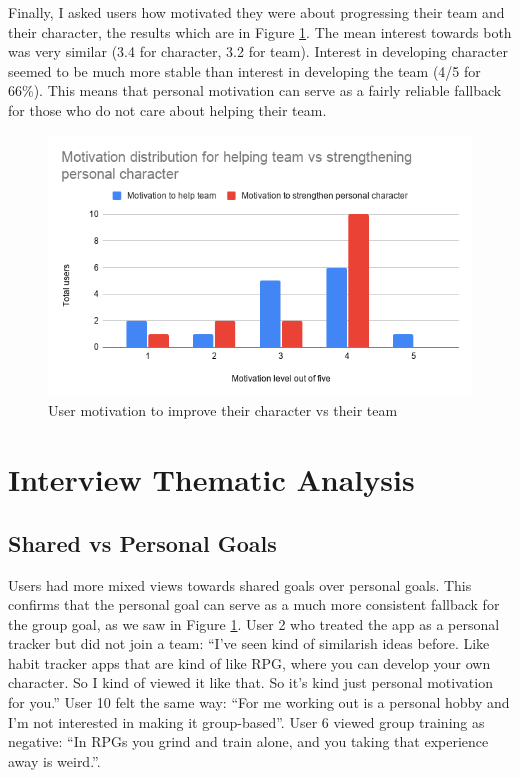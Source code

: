 \documentclass{l4proj}
\begin{document}
Finally, I asked users how motivated they were about progressing their team and their character, the results which are in Figure \ref{fig:character_vs_team}. The mean interest towards both was very similar (3.4 for character, 3.2 for team). Interest in developing character seemed to be much more stable than interest in developing the team (4/5 for 66\%). This means that personal motivation can serve as a fairly reliable fallback for those who do not care about helping their team. 
\begin{figure}[H]
    \centering
    \includegraphics[width=1.0\linewidth]{moviation_distribution_team_character.png}    
    \caption{User motivation to improve their character vs their team}
    \label{fig:character_vs_team} 
\end{figure}




\section{Interview Thematic Analysis}
\subsection{Shared vs Personal Goals}
Users had more mixed views towards shared goals over personal goals. This confirms that the personal goal can serve as a much more consistent fallback for the group goal, as we saw in Figure \ref{fig:character_vs_team}. User 2 who treated the app as a personal tracker but did not join a team: ``I've seen kind of similarish ideas before. Like habit tracker apps that are kind of like RPG, where you can develop your own character. So I kind of viewed it like that. So it's kind just personal motivation for you.''  User 10 felt the same way: ``For me working out is a personal hobby and I'm not interested in making it group-based''. User 6 viewed group training as negative: ``In RPGs you grind and train alone, and you taking that experience away is weird.''. 
\end{document}
